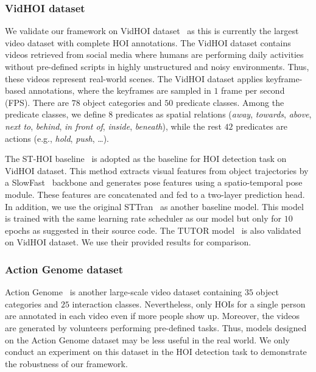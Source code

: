 \documentclass[times,twocolumn,final,authoryear]{elsarticle}
\begin{document}
\subsubsection{VidHOI dataset}
We validate our framework on VidHOI dataset~\citep{hoi_v_set:VidHOI} as this is currently the largest video dataset with complete HOI annotations. The VidHOI dataset contains videos retrieved from social media where humans are performing daily activities without pre-defined scripts in highly unstructured and noisy environments. Thus, these videos represent real-world scenes. The VidHOI dataset applies keyframe-based annotations, where the keyframes are sampled in $1$ frame per second (FPS). There are $78$ object categories and $50$ predicate classes. Among the predicate classes, we define $8$ predicates as spatial relations (\emph{away}, \emph{towards}, \emph{above}, \emph{next to}, \emph{behind}, \emph{in front of}, \emph{inside}, \emph{beneath}), while the rest $42$ predicates are actions (e.g., \emph{hold}, \emph{push}, \dots). 

The ST-HOI baseline~\citep{hoi_v_set:VidHOI} is adopted as the baseline for HOI detection task on VidHOI dataset. This method extracts visual features from object trajectories by a SlowFast~\citep{cnn:slowfast} backbone and generates pose features using a spatio-temporal pose module. These features are concatenated and fed to a two-layer prediction head. In addition, we use the original STTran~\citep{hoi_v2:sttran} as another baseline model. This model is trained with the same learning rate scheduler as our model but only for $10$ epochs as suggested in their source code. The TUTOR model~\citep{hoi_v2:tubelet_tokens} is also validated on VidHOI dataset. We use their provided results for comparison.

\subsubsection{Action Genome dataset}
Action Genome~\citep{hoi_v_set:action_genome} is another large-scale video dataset containing $35$ object categories and $25$ interaction classes. Nevertheless, only HOIs for a single person are annotated in each video even if more people show up. Moreover, the videos are generated by volunteers performing pre-defined tasks. Thus, models designed on the Action Genome dataset may be less useful in the real world. We only conduct an experiment on this dataset in the HOI detection task to demonstrate the robustness of our framework.
\end{document}
